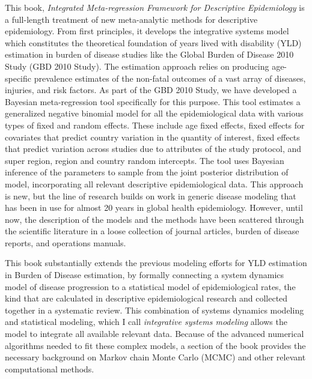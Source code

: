 This book, \emph{Integrated Meta-regression Framework for Descriptive
  Epidemiology} is a full-length treatment of new meta-analytic
methods for descriptive epidemiology.  From first principles, it
develops the integrative systems model which constitutes the
theoretical foundation of years lived with disability (YLD) estimation
in burden of disease studies like the Global Burden of Disease 2010
Study (GBD 2010 Study).  The estimation approach relies on producing
age-specific prevalence estimates of the non-fatal outcomes of a vast
array of diseases, injuries, and risk factors.  As part of the GBD
2010 Study, we have developed a Bayesian meta-regression tool
specifically for this purpose. This tool estimates a generalized
negative binomial model for all the epidemiological data with various
types of fixed and random effects.  These include age fixed effects,
fixed effects for covariates that predict country variation in the
quantity of interest, fixed effects that predict variation across
studies due to attributes of the study protocol, and super region,
region and country random intercepts.  The tool uses Bayesian
inference of the parameters to sample from the joint posterior
distribution of model, incorporating all relevant descriptive
epidemiological data.  This approach is new, but the line of research
builds on work in generic disease modeling that has been in use for
almost 20 years in global health
epidemiology.\cite{Barendregt_Generic_2003} However, until now, the
description of the models and the methods have been scattered through
the scientific literature in a loose collection of journal articles,
burden of disease reports, and operations manuals.

This book substantially extends the previous modeling efforts for YLD estimation
in Burden of Disease estimation, by formally connecting a system dynamics model of disease
progression to a statistical model of epidemiological rates, the kind
that are calculated in descriptive epidemiological research and
collected together in a systematic review.  This combination of
systems dynamics modeling and statistical modeling, which I call
\emph{integrative systems modeling} allows the model to integrate all
available relevant data.  Because of the advanced numerical algorithms needed to fit these complex models, a section of the book provides the
necessary background on Markov chain Monte Carlo (MCMC) and other
relevant computational methods.

